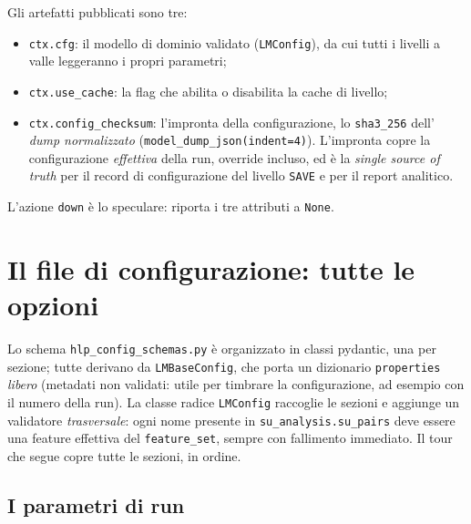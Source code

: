 Gli artefatti pubblicati sono tre:
\begin{itemize}
  \item \texttt{ctx.cfg}: il modello di dominio validato (\texttt{LMConfig}),
        da cui tutti i livelli a valle leggeranno i propri parametri;
  \item \texttt{ctx.use\_cache}: la flag che abilita o disabilita la cache di
        livello;
  \item \texttt{ctx.config\_checksum}: l'impronta della configurazione, lo
        \texttt{sha3\_256} dell' \emph{dump normalizzato}
        (\texttt{model\_dump\_json(indent=4)}). L'impronta copre la
        configurazione \emph{effettiva} della run, override incluso, ed è la
        \emph{single source of truth} per il record di configurazione del
        livello \texttt{SAVE} e per il report analitico.
\end{itemize}

L'azione \texttt{down} è lo speculare: riporta i tre attributi a
\texttt{None}.

\section{Il file di configurazione: tutte le opzioni}

Lo schema \texttt{hlp\_config\_schemas.py} è organizzato in classi pydantic,
una per sezione; tutte derivano da \texttt{LMBaseConfig}, che porta un
dizionario \texttt{properties} \emph{libero} (metadati non validati: utile
per timbrare la configurazione, ad esempio con il numero della run). La
classe radice \texttt{LMConfig} raccoglie le sezioni e aggiunge un
validatore \emph{trasversale}: ogni nome presente in
\texttt{su\_analysis.su\_pairs} deve essere una feature effettiva del
\texttt{feature\_set}, sempre con fallimento immediato. Il tour che segue
copre tutte le sezioni, in ordine.

\subsection{I parametri di run}

